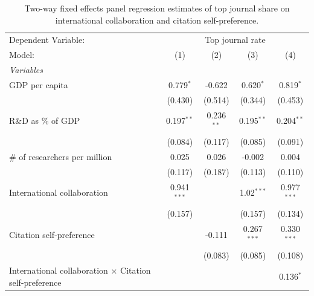 
\begin{table}[H]
   \caption{\label{tab:H2_topjournal} Two-way fixed effects panel regression estimates of top journal share on international
   collaboration and citation self-preference.}
   \centering
   \scriptsize
   \renewcommand*{\arraystretch}{0.7}
   \begin{tabular}{lcccc}
      \tabularnewline \midrule \midrule
      Dependent Variable: & \multicolumn{4}{c}{Top journal rate}\\
      Model:                                                         & (1)           & (2)          & (3)           & (4)\\  
      \midrule
      \emph{Variables}\\
      GDP per capita                                                 & 0.779$^{*}$   & -0.622       & 0.620$^{*}$   & 0.819$^{*}$\\   
                                                                     & (0.430)       & (0.514)      & (0.344)       & (0.453)\\   
      R\&D as \% of GDP                                              & 0.197$^{**}$  & 0.236$^{**}$ & 0.195$^{**}$  & 0.204$^{**}$\\   
                                                                     & (0.084)       & (0.117)      & (0.085)       & (0.091)\\   
      \# of researchers per million                                  & 0.025         & 0.026        & -0.002        & 0.004\\   
                                                                     & (0.117)       & (0.187)      & (0.113)       & (0.110)\\   
      International collaboration                                    & 0.941$^{***}$ &              & 1.02$^{***}$  & 0.977$^{***}$\\   
                                                                     & (0.157)       &              & (0.157)       & (0.134)\\   
      Citation self-preference                                       &               & -0.111       & 0.267$^{***}$ & 0.330$^{***}$\\   
                                                                     &               & (0.083)      & (0.085)       & (0.108)\\   
      International collaboration $\times$ Citation self-preference  &               &              &               & 0.136$^{*}$\\   

\end{tabular}
\end{table}
